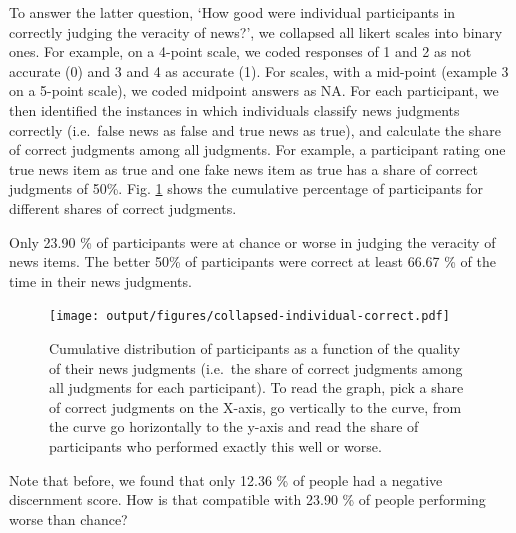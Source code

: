 \documentclass[
  doc,floatsintext]{apa6}
\begin{document}
To answer the latter question, `How good were individual participants in correctly judging the veracity of news?', we collapsed all likert scales into binary ones. For example, on a 4-point scale, we coded responses of 1 and 2 as not accurate (0) and 3 and 4 as accurate (1). For scales, with a mid-point (example 3 on a 5-point scale), we coded midpoint answers as NA. For each participant, we then identified the instances in which individuals classify news judgments correctly (i.e.~false news as false and true news as true), and calculate the share of correct judgments among all judgments. For example, a participant rating one true news item as true and one fake news item as true has a share of correct judgments of 50\%. Fig. \ref{fig:collapsed-individual-correct} shows the cumulative percentage of participants for different shares of correct judgments.

Only 23.90 \% of participants were at chance or worse in judging the veracity of news items. The better 50\% of participants were correct at least 66.67 \% of the time in their news judgments.



\begin{figure}
\centering
\texttt{[image: output/figures/collapsed-individual-correct.pdf]}
\caption{\label{fig:collapsed-individual-correct}Cumulative distribution of participants as a function of the quality of their news judgments (i.e.~the share of correct judgments among all judgments for each participant). To read the graph, pick a share of correct judgments on the X-axis, go vertically to the curve, from the curve go horizontally to the y-axis and read the share of participants who performed exactly this well or worse.}
\end{figure}

Note that before, we found that only 12.36 \% of people had a negative discernment score. How is that compatible with 23.90 \% of people performing worse than chance?
\end{document}
